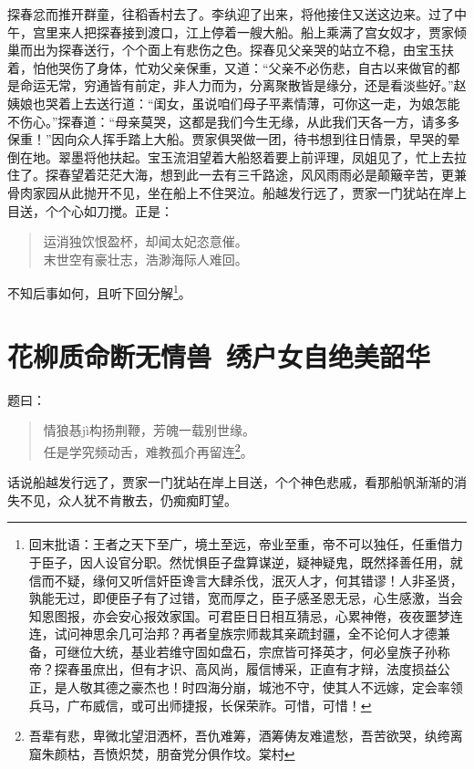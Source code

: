 \documentclass[12pt,oneside]{book}
\newenvironment{shici}{%
\begin{verse}%
\centering\large\hspace{12pt}}%
{\end{verse}}
\begin{document}
探春忿而推开群童，往稻香村去了。李纨迎了出来，将他接住又送这边来。过了中午，宫里来人把探春接到渡口，江上停着一艘大船。船上乘满了宫女奴才，贾家倾巢而出为探春送行，个个面上有悲伤之色。探春见父亲哭的站立不稳，由宝玉扶着，怕他哭伤了身体，忙劝父亲保重，又道：“父亲不必伤悲，自古以来做官的都是命运无常，穷通皆有前定，非人力而为，分离聚散皆是缘分，还是看淡些好。”赵姨娘也哭着上去送行道：“闺女，虽说咱们母子平素情薄，可你这一走，为娘怎能不伤心。”探春道：“母亲莫哭，这都是我们今生无缘，从此我们天各一方，请多多保重！”因向众人挥手踏上大船。贾家俱哭做一团，待书想到往日情景，早哭的晕倒在地。翠墨将他扶起。宝玉流泪望着大船怒着要上前评理，凤姐见了，忙上去拉住了。探春望着茫茫大海，想到此一去有三千路途，风风雨雨必是颠簸辛苦，更兼骨肉家园从此抛开不见，坐在船上不住哭泣。船越发行远了，贾家一门犹站在岸上目送，个个心如刀搅。正是：

\begin{shici}
运消独饮恨盈杯，却闻太妃恣意催。\\
末世空有豪壮志，浩渺海际人难回。
\end{shici}


不知后事如何，且听下回分解\footnote{回末批语：王者之天下至广，境土至远，帝业至重，帝不可以独任，任重借力于臣子，因人设官分职。然忧惧臣子盘算谋逆，疑神疑鬼，既然择善任用，就信而不疑，缘何又听信奸臣谗言大肆杀伐，泯灭人才，何其错谬！人非圣贤，孰能无过，即便臣子有了过错，宽而厚之，臣子感圣恩无忌，心生感激，当会知恩图报，亦会安心报效家国。可君臣日日相互猜忌，心累神倦，夜夜噩梦连连，试问神思余几可治邦？再者皇族宗师裁其亲疏封疆，全不论何人才德兼备，可继位大统，基业若维守固如盘石，宗庶皆可择英才，何必皇族子孙称帝？探春虽庶出，但有才识、高风尚，履信博采，正直有才辩，法度损益公正，是人敬其德之豪杰也！时四海分崩，城池不守，使其人不远嫁，定会率领兵马，广布威信，或可出师捷报，长保荣祚。可惜，可惜！}。


 
\chapter{花柳质命断无情兽~绣户女自绝美韶华}

题曰：

\begin{shici}
情狼惎jì构扬荆鞭，芳魄一载别世缘。\\
任是学究频动舌，难教孤介再留连\footnote{吾辈有悲，卑微北望泪洒杯，吾仇难筹，酒筹俦友难遣愁，吾苦欲哭，纨绔离窟朱颜枯，吾愤炽焚，朋奋党分俱作坟。棠村}。
\end{shici}

话说船越发行远了，贾家一门犹站在岸上目送，个个神色悲戚，看那船帆渐渐的消失不见，众人犹不肯散去，仍痴痴盯望。
\end{document}
